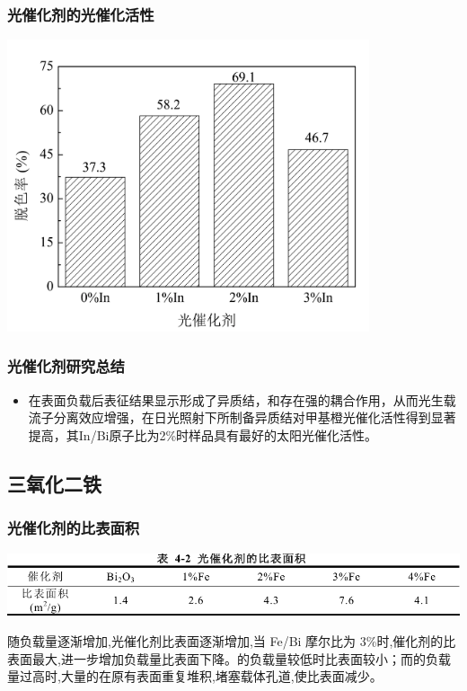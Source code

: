 \documentclass[xetex,compress]{mybeamer}
\begin{document}
\begin{frame}
\frametitle{光催化剂的光催化活性}
\begin{block}{}
\centering
\includegraphics[width=0.8\textwidth]{figures/三氧化二铟脱色率.jpg} 
\end{block}
\end{frame}

\begin{frame}
\frametitle{光催化剂研究总结}
\begin{block}{}
\begin{itemize}
\item 在表面负载后表征结果显示形成了异质结，和存在强的耦合作用，从而光生载流子分离效应增强，在日光照射下所制备异质结对甲基橙光催化活性得到显著提高，其In/Bi原子比为2\%时样品具有最好的太阳光催化活性。%
\end{itemize}
\end{block}
\end{frame}

\subsection{三氧化二铁}
\begin{frame}
\frametitle{光催化剂的比表面积}
\centering
\includegraphics[width=\textwidth]{figures/三氧化二铁比表面积.pdf} 
\begin{block}{}
随负载量逐渐增加,光催化剂比表面逐渐增加,当 Fe/Bi 摩尔比为 3\%时,催化剂的比表面最大,进一步增加负载量比表面下降。的负载量较低时比表面较小；而的负载量过高时,大量的在原有表面重复堆积,堵塞载体孔道,使比表面减少。
\end{block}
\end{frame}
\end{document}
